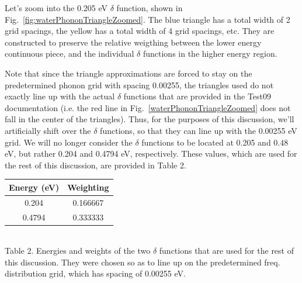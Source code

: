 \documentclass[10pt]{article}
\begin{document}
\begin{multicols}{2}
  Let's zoom into the 0.205 eV $\delta$ function, shown in Fig.~\ref{fig:waterPhononTriangleZoomed}. The blue triangle has a total width of 2 grid spacings, the yellow has a total width of 4 grid spacings, etc. They are constructed to preserve the relative weigthing between the lower energy continuous piece, and the individual $\delta$ functions in the higher energy region.\par
  
  Note that since the triangle approximations are forced to stay on the predetermined phonon grid with spacing 0.00255, the triangles used do not exactly line up with the actual $\delta$ functions that are provided in the Test09 documentation (i.e. the red line in Fig.~\ref{waterPhononTriangleZoomed} does not fall in the center of the triangles). Thus, for the purposes of this discussion, we'll artificially shift over the $\delta$ functions, so that they can line up with the 0.00255 eV grid. We will no longer consider the $\delta$ functions to be located at 0.205 and 0.48 eV, but rather 0.204 and 0.4794 eV, respectively. These values, which are used for the rest of this discussion, are provided in Table 2.

\begin{center}
\begin{tabular}{ |c|c| }\hline
 Energy (eV)& Weighting\\\hline
 0.204& 0.166667\\\hline
 0.4794 & 0.333333 \\\hline
\end{tabular}\\[1ex]
Table 2. Energies and weights of the two $\delta$ functions that are used for the rest of this discussion. They were chosen so as to line up on the predetermined freq. distribution grid, which has spacing of 0.00255 eV.
\end{center}
 

\end{multicols}
\end{document}
